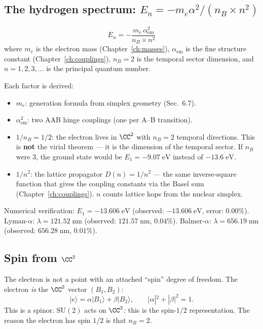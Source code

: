 \subsection{The hydrogen spectrum: $E_n = -m_e\alpha^2/(n_B \times n^2)$}

\begin{theorem}
\begin{equation}
\boxed{E_n = -\frac{m_e\,\alpha_\text{em}^2}{n_B \times n^2}}
\end{equation}
where $m_e$ is the electron mass (Chapter~\ref{ch:masses}), $\alpha_\text{em}$ is the fine structure constant (Chapter~\ref{ch:couplings}), $n_B = 2$ is the temporal sector dimension, and $n = 1, 2, 3, \ldots$ is the principal quantum number.
\end{theorem}

Each factor is derived:
\begin{itemize}
\item $m_e$: generation formula from simplex geometry (Sec.~6.7).
\item $\alpha_\text{em}^2$: two AAB hinge couplings (one per A--B transition).
\item $1/n_B = 1/2$: the electron lives in $\CC^2$ with $n_B = 2$ temporal directions. This is \textbf{not} the virial theorem --- it is the dimension of the temporal sector. If $n_B$ were 3, the ground state would be $E_1 = -9.07\;\text{eV}$ instead of $-13.6\;\text{eV}$.
\item $1/n^2$: the lattice propagator $D(n) = 1/n^2$ --- the same inverse-square function that gives the coupling constants via the Basel sum (Chapter~\ref{ch:couplings}). $n$ counts lattice hops from the nuclear simplex.
\end{itemize}

Numerical verification: $E_1 = -13.606\;\text{eV}$ (observed: $-13.606\;\text{eV}$, error: $0.00\%$). Lyman-$\alpha$: $\lambda = 121.52\;\text{nm}$ (observed: $121.57\;\text{nm}$, $0.04\%$). Balmer-$\alpha$: $\lambda = 656.19\;\text{nm}$ (observed: $656.28\;\text{nm}$, $0.01\%$).

\subsection{Spin from $\CC^2$}

The electron is not a point with an attached ``spin'' degree of freedom. The electron \emph{is} the $\CC^2$ vector $(B_1, B_2)$:
\begin{equation}
|e\rangle = \alpha|B_1\rangle + \beta|B_2\rangle, \qquad |\alpha|^2 + |\beta|^2 = 1.
\end{equation}
This is a spinor. $\text{SU}(2)$ acts on $\CC^2$: this is the spin-$1/2$ representation. The reason the electron has spin $1/2$ is that $n_B = 2$.

